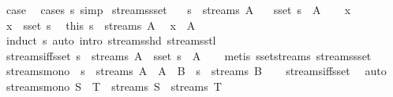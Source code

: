 \begin{isabellebody}
\ {\isacharquery}case\ \isamarkupfalse%
\ {\isacharparenleft}cases\ s{\isacharparenright}\ simp\isanewline
{}\isamarkupfalse%
%
\endisatagproof
{\isafoldproof}%
%
\isadelimproof
\isanewline
%
\endisadelimproof
\isanewline
{}\isamarkupfalse%
\ streams{\isacharunderscore}sset{\isacharcolon}\isanewline
\ \ \ {\isachardoublequoteopen}s\ {\isasymin}\ streams\ A{\isachardoublequoteclose}\isanewline
\ \ \ {\isachardoublequoteopen}sset\ s\ {\isasymsubseteq}\ A{\isachardoublequoteclose}\isanewline
%
\isadelimproof
%
\endisadelimproof
%
\isatagproof
{}\isamarkupfalse%
\isanewline
\ \ \isamarkupfalse%
\ x\ \isamarkupfalse%
\ {\isachardoublequoteopen}x\ {\isasymin}\ sset\ s{\isachardoublequoteclose}\ \isamarkupfalse%
\ this\ {\isacartoucheopen}s\ {\isasymin}\ streams\ A{\isacartoucheclose}\ \isamarkupfalse%
\ {\isachardoublequoteopen}x\ {\isasymin}\ A{\isachardoublequoteclose}\isanewline
\ \ \ \ \isamarkupfalse%
\ {\isacharparenleft}induct\ s{\isacharparenright}\ {\isacharparenleft}auto\ intro{\isacharcolon}\ streams{\isacharunderscore}shd\ streams{\isacharunderscore}stl{\isacharparenright}\isanewline
{}\isamarkupfalse%
%
\endisatagproof
{\isafoldproof}%
%
\isadelimproof
\isanewline
%
\endisadelimproof
\isanewline
{}\isamarkupfalse%
\ streams{\isacharunderscore}iff{\isacharunderscore}sset{\isacharcolon}\ {\isachardoublequoteopen}s\ {\isasymin}\ streams\ A\ {\isasymlongleftrightarrow}\ sset\ s\ {\isasymsubseteq}\ A{\isachardoublequoteclose}\isanewline
%
\isadelimproof
\ \ %
\endisadelimproof
%
\isatagproof
{}\isamarkupfalse%
\ {\isacharparenleft}metis\ sset{\isacharunderscore}streams\ streams{\isacharunderscore}sset{\isacharparenright}%
\endisatagproof
{\isafoldproof}%
%
\isadelimproof
\isanewline
%
\endisadelimproof
\isanewline
{}\isamarkupfalse%
\ streams{\isacharunderscore}mono{\isacharcolon}\ \ {\isachardoublequoteopen}s\ {\isasymin}\ streams\ A\ {\isasymLongrightarrow}\ A\ {\isasymsubseteq}\ B\ {\isasymLongrightarrow}\ s\ {\isasymin}\ streams\ B{\isachardoublequoteclose}\isanewline
%
\isadelimproof
\ \ %
\endisadelimproof
%
\isatagproof
{}\isamarkupfalse%
\ streams{\isacharunderscore}iff{\isacharunderscore}sset\ \isamarkupfalse%
\ auto%
\endisatagproof
{\isafoldproof}%
%
\isadelimproof
\isanewline
%
\endisadelimproof
\isanewline
{}\isamarkupfalse%
\ streams{\isacharunderscore}mono{}{\isacharcolon}\ {\isachardoublequoteopen}S\ {\isasymsubseteq}\ T\ {\isasymLongrightarrow}\ streams\ S\ {\isasymsubseteq}\ streams\ T{\isachardoublequoteclose}\isanewline

\end{isabellebody}

